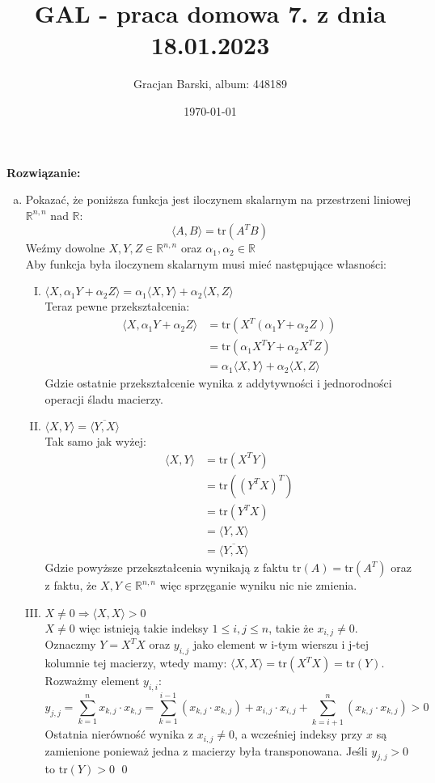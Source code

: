 \documentclass[11pt]{article}
\title{GAL - praca domowa 7. z dnia 18.01.2023}
\author{Gracjan Barski, album: 448189}
\date{\today}
\newcommand{\R}{\mathbb{R}}
\newcommand{\tr}{\mathrm{tr}}
\begin{document}
\maketitle
\textbf{Rozwiązanie:}
\begin{enumerate}[(a)]
    \item Pokazać, że poniższa funkcja jest iloczynem skalarnym na przestrzeni liniowej $\R^{n,n}$ nad $\R$:
    $$\langle A, B \rangle = \tr(A^TB)$$
    Weźmy dowolne $X, Y, Z \in \R^{n,n}$ oraz $\alpha_1, \alpha_2 \in \R$ \\
    Aby funkcja była iloczynem skalarnym musi mieć następujące własności:
    \begin{enumerate}[I.]
        \item $\langle X, \alpha_1 Y + \alpha_2 Z  \rangle = \alpha_1 \langle X, Y \rangle + \alpha_2 \langle X, Z \rangle$ \\[5pt]
        Teraz pewne przekształcenia:
        \begin{align*}
            \langle X, \alpha_1 Y + \alpha_2 Z  \rangle &= \tr(X^T (\alpha_1 Y + \alpha_2 Z)) \\
            &= \tr(\alpha_1X^TY + \alpha_2 X^TZ) \\
            &= \alpha_1 \langle X, Y \rangle + \alpha_2 \langle X, Z \rangle
        \end{align*}
        Gdzie ostatnie przekształcenie wynika z addytywności i jednorodności operacji śladu macierzy.

        \item $\langle X, Y \rangle = \overline{\langle Y, X \rangle}$ \\[5pt]
        Tak samo jak wyżej:
        \begin{align*}
            \langle X, Y \rangle &= \tr(X^T Y) \\
            &= \tr((Y^T X)^T) \\
            &= \tr(Y^T X) \\
            &= \langle Y, X \rangle \\
            &= \overline{\langle Y, X \rangle}
        \end{align*}
        Gdzie powyższe przekształcenia wynikają z faktu $\tr(A) = \tr(A^T)$ oraz z faktu, że $X,Y \in \R^{n,n}$ więc sprzęganie wyniku nic nie zmienia.

        \item $X \neq 0 \Longrightarrow \langle X, X \rangle > 0$ \\[5pt]
        $X \neq 0$ więc istnieją takie indeksy $1 \leq i, j \leq n$, takie że $x_{i,j} \neq 0$. \\
        Oznaczmy $Y = X^TX$ oraz $y_{i,j}$ jako element w i-tym wierszu i j-tej kolumnie tej macierzy, wtedy mamy: $\langle X, X \rangle = \tr (X^TX) = \tr(Y)$. Rozważmy element $y_{i,i}$:
        $$y_{j, j} = \sum_{k = 1}^n x_{k, j} \cdot x_{k, j} = \sum_{k = 1}^{i - 1} (x_{k, j} \cdot x_{k, j}) + x_{i, j} \cdot x_{i, j} + \sum_{k = i + 1}^{n} (x_{k, j} \cdot x_{k, j}) > 0$$
        Ostatnia nierówność wynika z $x_{i, j} \neq 0$, a wcześniej indeksy przy $x$ są zamienione ponieważ jedna z macierzy była transponowana. Jeśli $y_{j,j} > 0$ to $\tr(Y) > 0$ \qed
    \end{enumerate}


\end{enumerate}
\end{document}
